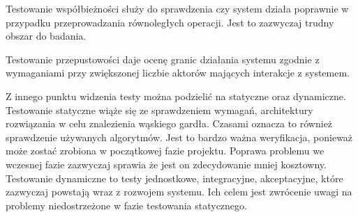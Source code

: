 Testowanie współbieżności służy do sprawdzenia czy system działa poprawnie w przypadku przeprowadzania równoległych operacji.
Jest to zazwyczaj trudny obszar do badania.

Testowanie przepustowości daje ocenę granic działania systemu zgodnie z wymaganiami przy zwiększonej liczbie aktorów mających interakcje z systemem.

Z innego punktu widzenia testy można podzielić na statyczne oraz dynamiczne.
Testowanie statyczne wiąże się ze sprawdzeniem wymagań, architektury rozwiązania w celu znalezienia wąskiego gardła.
Czasami oznacza to również sprawdzenie używanych algorytmów.
Jest to bardzo ważna weryfikacja, ponieważ może zostać zrobiona w początkowej fazie projektu.
Poprawa problemu we wczesnej fazie zazwyczaj sprawia że jest on zdecydowanie mniej kosztowny.
Testowanie dynamiczne to testy jednostkowe, integracyjne, akceptacyjne, które zazwyczaj powstają wraz z rozwojem systemu.
Ich celem jest zwrócenie uwagi na problemy niedostrzeżone w fazie testowania statycznego.
